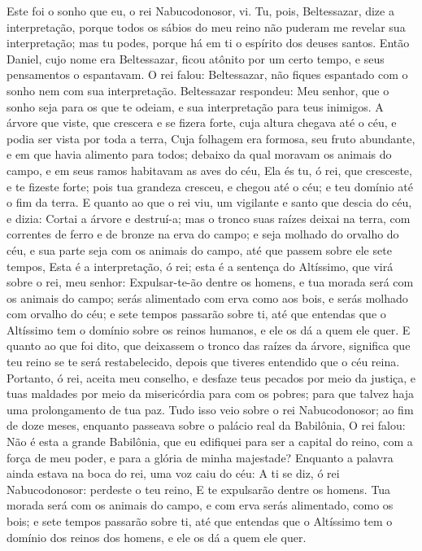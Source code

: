 {Este foi o sonho que eu, o rei Nabucodonosor, vi. Tu, pois, Beltessazar, dize a interpretação, porque todos os sábios do meu reino não puderam me revelar sua interpretação; mas tu podes, porque há em ti o espírito dos deuses santos.
Então Daniel, cujo nome era Beltessazar, ficou atônito por um certo tempo, e seus pensamentos o espantavam. O rei falou: Beltessazar, não fiques espantado com o sonho nem com sua interpretação. Beltessazar respondeu: Meu senhor, que o sonho seja para os que te odeiam, e sua interpretação para teus inimigos.
A árvore que viste, que crescera e se fizera forte, cuja altura chegava até o céu, e podia ser vista por toda a terra,
Cuja folhagem era formosa, seu fruto abundante, e em que havia alimento para todos; debaixo da qual moravam os animais do campo, e em seus ramos habitavam as aves do céu,
Ela és tu, ó rei, que cresceste, e te fizeste forte; pois tua grandeza cresceu, e chegou até o céu; e teu domínio até o fim da terra.
E quanto ao que o rei viu, um vigilante e santo que descia do céu, e dizia: Cortai a árvore e destruí-a; mas o tronco
{} suas raízes deixai na terra, com correntes de ferro e de bronze na erva do campo; e seja molhado do orvalho do céu, e sua parte seja com os animais do campo, até que passem sobre ele sete tempos,
Esta é a interpretação, ó rei; esta é a sentença do Altíssimo, que virá sobre o rei, meu senhor:
Expulsar-te-ão dentre os homens, e tua morada será com os animais do campo; serás alimentado com erva como aos bois, e serás molhado com orvalho do céu; e sete tempos passarão sobre ti, até que entendas que o Altíssimo tem o domínio sobre os reinos humanos, e ele os dá a quem ele quer.
E quanto ao que foi dito, que deixassem o tronco
{} das raízes da árvore, significa que teu reino se te será restabelecido, depois que tiveres entendido que o céu reina.
Portanto, ó rei, aceita meu conselho, e desfaze teus pecados por meio da justiça, e tuas maldades por meio da misericórdia para com os pobres; para que talvez haja uma prolongamento de tua paz.
Tudo isso veio sobre o rei Nabucodonosor;
 ao fim de doze meses, enquanto passeava sobre o palácio real da Babilônia,
O rei falou: Não é esta a grande Babilônia, que eu edifiquei para ser a capital
 do reino, com a força de meu poder, e para a glória de minha majestade?
Enquanto a palavra ainda estava na boca do rei, uma voz caiu do céu: A ti se diz, ó rei Nabucodonosor: perdeste o teu reino,
E te expulsarão dentre os homens. Tua morada será com os animais do campo, e com erva serás alimentado, como os bois; e sete tempos passarão sobre ti, até que entendas que o Altíssimo tem o domínio dos reinos dos homens, e ele os dá a quem ele quer.
}
